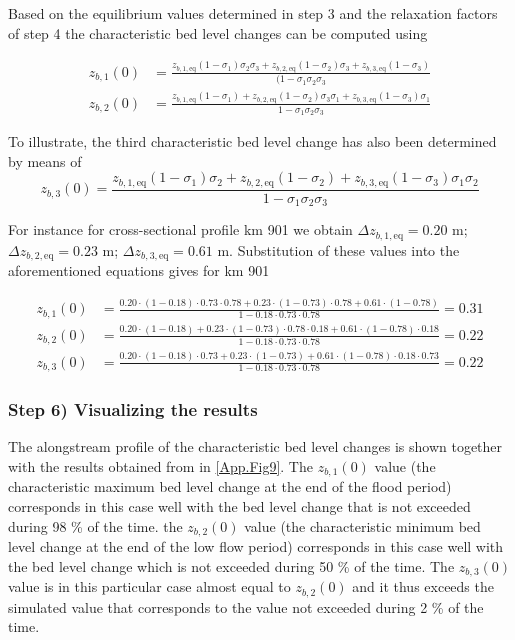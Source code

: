 Based on the equilibrium values determined in step 3 and the relaxation factors of step 4 the characteristic bed level changes can be computed using

\begin{align}
z_{b,1}(0) &= \frac{z_{b,1,\text{eq}} (1-\sigma_1) \sigma_2 \sigma_3 + z_{b,2,\text{eq}} (1-\sigma_2) \sigma_3 + z_{b,3,\text{eq}} (1-\sigma_3)}{(1 - \sigma_1 \sigma_2 \sigma_3} \\
z_{b,2}(0) &= \frac{z_{b,1,\text{eq}} (1-\sigma_1) + z_{b,2,\text{eq}} (1-\sigma_2) \sigma_3 \sigma_1 + z_{b,3,\text{eq}} (1-\sigma_3) \sigma_1}{1 - \sigma_1 \sigma_2 \sigma_3}
\end{align}

To illustrate, the third characteristic bed level change has also been determined by means of
%
\begin{equation}
z_{b,3}(0) = \frac{z_{b,1,\text{eq}} (1-\sigma_1) \sigma_2 + z_{b,2,\text{eq}} (1-\sigma_2) + z_{b,3,\text{eq}} (1-\sigma_3) \sigma_1 \sigma_2}{1 - \sigma_1 \sigma_2 \sigma_3}
\end{equation}

For instance for cross-sectional profile km 901 we obtain $\Delta z_{b,1,\text{eq}} = 0.20$ m; $\Delta z_{b,2,\text{eq}} = 0.23$ m; $\Delta z_{b,3,\text{eq}} = 0.61$ m.
Substitution of these values into the aforementioned equations gives for km 901

\begin{align}
z_{b,1}(0) &= \tfrac{0.20 \cdot (1-0.18) \cdot 0.73 \cdot 0.78 + 0.23 \cdot (1-0.73) \cdot 0.78 + 0.61 \cdot (1-0.78)}{1 - 0.18 \cdot 0.73 \cdot 0.78} = 0.31 \\
z_{b,2}(0) &= \tfrac{0.20 \cdot (1-0.18) + 0.23 \cdot (1-0.73) \cdot 0.78 \cdot 0.18 + 0.61 \cdot (1-0.78) \cdot 0.18}{1 - 0.18 \cdot 0.73 \cdot 0.78} = 0.22 \\
z_{b,3}(0) &= \tfrac{0.20 \cdot (1-0.18) \cdot 0.73 + 0.23 \cdot (1-0.73) + 0.61 \cdot (1-0.78) \cdot 0.18 \cdot 0.73}{1 - 0.18 \cdot 0.73 \cdot 0.78} = 0.22
\end{align}

\subsubsection*{Step 6) Visualizing the results}

The alongstream profile of the characteristic bed level changes is shown together with the results obtained from \sobek in \autoref{App.Fig9}.
The $z_{b,1}(0)$ value (the characteristic maximum bed level change at the end of the flood period) corresponds in this case well with the bed level change that is not exceeded during 98 \% of the time.
the $z_{b,2}(0)$ value (the characteristic minimum bed level change at the end of the low flow period) corresponds in this case well with the bed level change which is not exceeded during 50 \% of the time.
The $z_{b,3}(0)$ value is in this particular case almost equal to $z_{b,2}(0)$ and it thus exceeds the simulated value that corresponds to the value not exceeded during 2 \% of the time.

